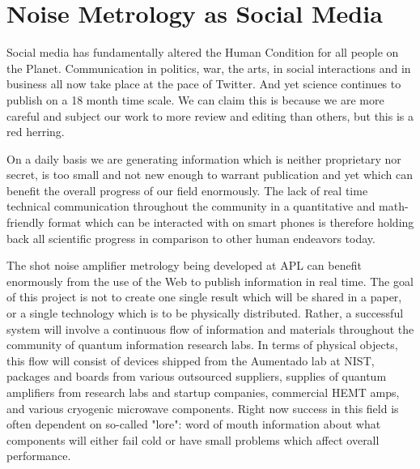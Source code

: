 \documentclass[11pt]{article}
\begin{document}
\section{
Noise Metrology as Social Media}



    Social media has fundamentally altered the Human Condition for all people on the Planet.  Communication in politics, war, the arts, in social interactions and in business all now take place at the pace of Twitter.  And yet science continues to publish on a 18 month time scale.  We can claim this is because we are more careful and subject our work to more review and editing than others, but this is a red herring.  




    On a daily basis we are generating information which is neither proprietary nor secret, is too small and not new enough to warrant publication and yet which can benefit the overall progress of our field enormously.  The lack of real time technical communication throughout the community in a quantitative and math-friendly format which can be interacted with on smart phones is therefore holding back all scientific progress in comparison to other human endeavors today.  




    The shot noise amplifier metrology being developed at APL can benefit enormously from the use of the Web to publish information in real time.  The goal of this project is not to create one single result which will be shared in a paper, or a single technology which is to be physically distributed.  Rather, a successful system will involve a continuous flow of information and materials throughout the community of quantum information research labs.  In terms of physical objects, this flow will consist of devices shipped from the Aumentado lab at NIST, packages and boards from various outsourced suppliers, supplies of quantum amplifiers from research labs and startup companies, commercial HEMT amps, and various cryogenic microwave components.  Right now success in this field is often dependent on so-called "lore": word of mouth information about what components will either fail cold or have small problems which affect overall performance. 
\end{document}

